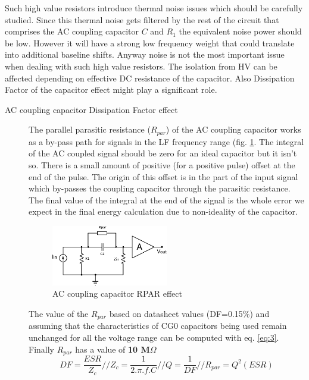 \documentclass[a4paper,11pt]{report}
\begin{document}
Such high value resistors introduce thermal noise issues which should be carefully studied. Since this thermal noise gets filtered by the rest of the circuit that comprises the AC coupling capacitor $C$ and $R_1$ the equivalent noise power should be low. However it will have a strong low frequency weight that could translate into additional baseline shifts. Anyway noise is not the most important issue when dealing with such high value resistors. The isolation from HV can be affected depending on effective DC resistance of the capacitor. Also Dissipation Factor of the capacitor effect might play a significant role.
\begin{description}
    \item[AC coupling capacitor Dissipation Factor effect] 
    The parallel parasitic resistance ($R_{par}$) of the AC coupling capacitor works as a by-pass path for signals in the LF frequency range (fig. \ref{fig:RPAR}. The integral of the AC coupled signal should be zero for an ideal capacitor but it isn't so. There is a small amount of positive (for a positive pulse) offset at the end of the pulse. The origin of this offset is in the part of the input signal which by-passes the coupling capacitor through the parasitic resistance. The final value of the integral at the end of the signal is the whole error we expect in the final energy calculation due to non-ideality of the capacitor.
    
    \begin{figure}
      \begin{center}
        \includegraphics[width=0.5\textwidth]{./figures/RPAR_effect}
        \caption{AC coupling capacitor RPAR effect}
        \label{fig:RPAR}
      \end{center}
    \end{figure}
    
    The value of the $R_{par}$ based on datasheet values (DF=0.15\%) and assuming that the characteristics of CG0 capacitors being used remain unchanged for all the voltage range can be computed with eq. \ref{eq:3}. Finally $R_{par}$ has a value of \textbf{10 M$\Omega$}
    \begin{equation}
    DF = \frac{ESR}{Z_c} // 
    Z_c = \frac{1}{2.\pi.f.C} //
    Q = \frac{1}{DF} //
    R_{par} = Q^{2}(ESR) 
    \label{eq:3}
    \end{equation}
  \end{description}  
\end{document}
